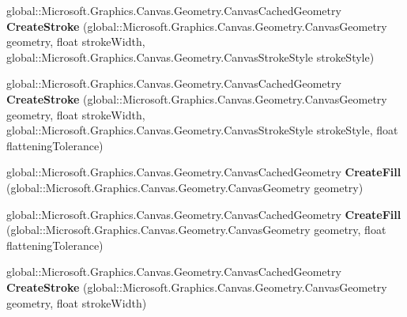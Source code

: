 \begin{DoxyCompactItemize}
global\+::\+Microsoft.\+Graphics.\+Canvas.\+Geometry.\+Canvas\+Cached\+Geometry {\bfseries Create\+Stroke} (global\+::\+Microsoft.\+Graphics.\+Canvas.\+Geometry.\+Canvas\+Geometry geometry, float stroke\+Width, global\+::\+Microsoft.\+Graphics.\+Canvas.\+Geometry.\+Canvas\+Stroke\+Style stroke\+Style)
\item 
\mbox{\label{interface_microsoft_1_1_graphics_1_1_canvas_1_1_geometry_1_1_i_canvas_cached_geometry_statics_af2be06fab26ecb06f7f43abc6c9f7a87}} 
global\+::\+Microsoft.\+Graphics.\+Canvas.\+Geometry.\+Canvas\+Cached\+Geometry {\bfseries Create\+Stroke} (global\+::\+Microsoft.\+Graphics.\+Canvas.\+Geometry.\+Canvas\+Geometry geometry, float stroke\+Width, global\+::\+Microsoft.\+Graphics.\+Canvas.\+Geometry.\+Canvas\+Stroke\+Style stroke\+Style, float flattening\+Tolerance)
\item 
\mbox{\label{interface_microsoft_1_1_graphics_1_1_canvas_1_1_geometry_1_1_i_canvas_cached_geometry_statics_a16df585fb0ca36d40ef89871533acc2a}} 
global\+::\+Microsoft.\+Graphics.\+Canvas.\+Geometry.\+Canvas\+Cached\+Geometry {\bfseries Create\+Fill} (global\+::\+Microsoft.\+Graphics.\+Canvas.\+Geometry.\+Canvas\+Geometry geometry)
\item 
\mbox{\label{interface_microsoft_1_1_graphics_1_1_canvas_1_1_geometry_1_1_i_canvas_cached_geometry_statics_af902923a82387d578dcc6b4a2ac54662}} 
global\+::\+Microsoft.\+Graphics.\+Canvas.\+Geometry.\+Canvas\+Cached\+Geometry {\bfseries Create\+Fill} (global\+::\+Microsoft.\+Graphics.\+Canvas.\+Geometry.\+Canvas\+Geometry geometry, float flattening\+Tolerance)
\item 
\mbox{\label{interface_microsoft_1_1_graphics_1_1_canvas_1_1_geometry_1_1_i_canvas_cached_geometry_statics_a979cdeceea3a10a40d02ca0440985082}} 
global\+::\+Microsoft.\+Graphics.\+Canvas.\+Geometry.\+Canvas\+Cached\+Geometry {\bfseries Create\+Stroke} (global\+::\+Microsoft.\+Graphics.\+Canvas.\+Geometry.\+Canvas\+Geometry geometry, float stroke\+Width)
\item 

\end{DoxyCompactItemize}
